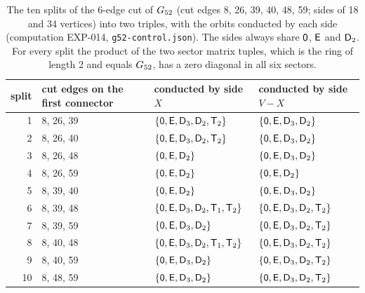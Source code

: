 \begin{table}[t]\centering\footnotesize
\setlength{\tabcolsep}{4pt}
\begin{tabular}{rlll}
\toprule
split & cut edges on the first connector & conducted by side $X$ & conducted by side $V - X$ \\
\midrule
1 & 8, 26, 39 & $\{\mathsf{0},\mathsf{E},\mathsf{D}_3,\mathsf{D}_2,\mathsf{T}_2\}$ & $\{\mathsf{0},\mathsf{E},\mathsf{D}_3,\mathsf{D}_2\}$ \\
2 & 8, 26, 40 & $\{\mathsf{0},\mathsf{E},\mathsf{D}_3,\mathsf{D}_2,\mathsf{T}_2\}$ & $\{\mathsf{0},\mathsf{E},\mathsf{D}_3,\mathsf{D}_2\}$ \\
3 & 8, 26, 48 & $\{\mathsf{0},\mathsf{E},\mathsf{D}_2\}$ & $\{\mathsf{0},\mathsf{E},\mathsf{D}_3,\mathsf{D}_2\}$ \\
4 & 8, 26, 59 & $\{\mathsf{0},\mathsf{E},\mathsf{D}_2\}$ & $\{\mathsf{0},\mathsf{E},\mathsf{D}_2\}$ \\
5 & 8, 39, 40 & $\{\mathsf{0},\mathsf{E},\mathsf{D}_2\}$ & $\{\mathsf{0},\mathsf{E},\mathsf{D}_3,\mathsf{D}_2\}$ \\
6 & 8, 39, 48 & $\{\mathsf{0},\mathsf{E},\mathsf{D}_3,\mathsf{D}_2,\mathsf{T}_1,\mathsf{T}_2\}$ & $\{\mathsf{0},\mathsf{E},\mathsf{D}_3,\mathsf{D}_2,\mathsf{T}_2\}$ \\
7 & 8, 39, 59 & $\{\mathsf{0},\mathsf{E},\mathsf{D}_3,\mathsf{D}_2\}$ & $\{\mathsf{0},\mathsf{E},\mathsf{D}_3,\mathsf{D}_2,\mathsf{T}_2\}$ \\
8 & 8, 40, 48 & $\{\mathsf{0},\mathsf{E},\mathsf{D}_3,\mathsf{D}_2,\mathsf{T}_1,\mathsf{T}_2\}$ & $\{\mathsf{0},\mathsf{E},\mathsf{D}_3,\mathsf{D}_2,\mathsf{T}_2\}$ \\
9 & 8, 40, 59 & $\{\mathsf{0},\mathsf{E},\mathsf{D}_3,\mathsf{D}_2\}$ & $\{\mathsf{0},\mathsf{E},\mathsf{D}_3,\mathsf{D}_2,\mathsf{T}_2\}$ \\
10 & 8, 48, 59 & $\{\mathsf{0},\mathsf{E},\mathsf{D}_3,\mathsf{D}_2\}$ & $\{\mathsf{0},\mathsf{E},\mathsf{D}_3,\mathsf{D}_2,\mathsf{T}_2\}$ \\
\bottomrule
\end{tabular}
\caption{The ten splits of the 6-edge cut of $G_{52}$ (cut edges 8, 26, 39, 40, 48, 59; sides of 18 and 34 vertices) into two triples, with the orbits conducted by each side (computation EXP-014, \texttt{g52-control.json}). The sides always share $\mathsf{0}$, $\mathsf{E}$ and $\mathsf{D}_2$. For every split the product of the two sector matrix tuples, which is the ring of length 2 and equals $G_{52}$, has a zero diagonal in all six sectors.}\label{tab:control}
\end{table}
